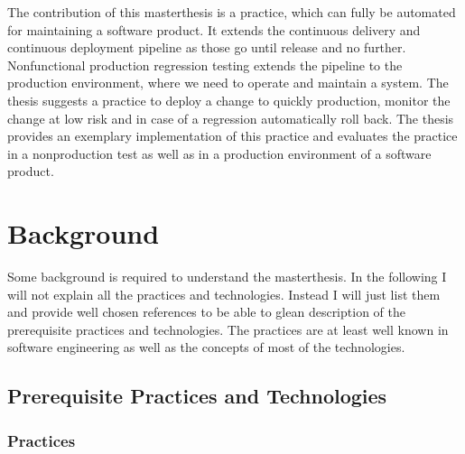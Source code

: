 The contribution of this masterthesis is a practice, which can fully be automated for
maintaining a software product. It extends the continuous delivery and continuous
deployment pipeline as those go until release and no further. Nonfunctional production
regression testing extends the pipeline to the production environment, where we need to
operate and maintain a system. The thesis suggests a practice to deploy a change to
quickly production, monitor the change at low risk and in case of a regression
automatically roll back. The thesis provides an exemplary implementation of this practice
and evaluates the practice in a nonproduction test as well as in a production environment
of a software product.

\chapter{Background}

Some background is required to understand the masterthesis. In the following I will not
explain all the practices and technologies. Instead I will just list them and provide well
chosen references to be able to glean description of the prerequisite practices and
technologies. The practices are at least well known in software engineering as well as the
concepts of most of the technologies.

\section{Prerequisite Practices and Technologies}

\subsection{Practices}

